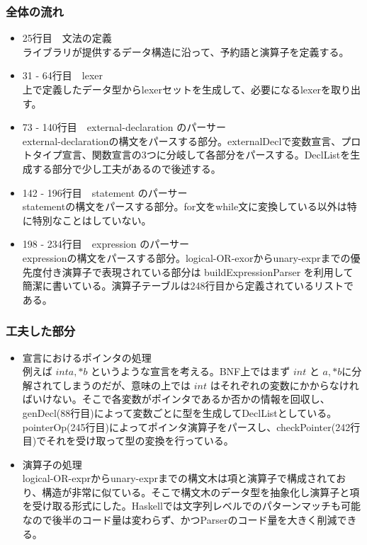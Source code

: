 \documentclass{jsarticle}
\begin{document}
\subsubsection{全体の流れ}
\begin{itemize}
\item 25行目　文法の定義 \mbox{} \\
ライブラリが提供するデータ構造に沿って、予約語と演算子を定義する。
\item 31 - 64行目　lexer \mbox{} \\
上で定義したデータ型からlexerセットを生成して、必要になるlexerを取り出す。
\item 73 - 140行目　external-declaration のパーサー \mbox{} \\
external-declarationの構文をパースする部分。externalDeclで変数宣言、プロトタイプ宣言、関数宣言の3つに分岐して各部分をパースする。DeclListを生成する部分で少し工夫があるので後述する。
\item 142 - 196行目　statement のパーサー \mbox{} \\
statementの構文をパースする部分。for文をwhile文に変換している以外は特に特別なことはしていない。
\item 198 - 234行目　expression のパーサー \mbox{} \\
expressionの構文をパースする部分。logical-OR-exorからunary-exprまでの優先度付き演算子で表現されている部分は buildExpressionParser を利用して簡潔に書いている。演算子テーブルは248行目から定義されているリストである。
\end{itemize}
\subsubsection{工夫した部分}
\begin{itemize}
\item 宣言におけるポインタの処理 \mbox{} \\
例えば $int a, *b$ というような宣言を考える。BNF上ではまず $int$ と $a, *b$に分解されてしまうのだが、意味の上では $int$ はそれぞれの変数にかからなければいけない。そこで各変数がポインタであるか否かの情報を回収し、genDecl(88行目)によって変数ごとに型を生成してDeclListとしている。pointerOp(245行目)によってポインタ演算子をパースし、checkPointer(242行目)でそれを受け取って型の変換を行っている。\\
\item 演算子の処理 \mbox{} \\
logical-OR-exprからunary-exprまでの構文木は項と演算子で構成されており、構造が非常に似ている。そこで構文木のデータ型を抽象化し演算子と項を受け取る形式にした。Haskellでは文字列レベルでのパターンマッチも可能なので後半のコード量は変わらず、かつParserのコード量を大きく削減できる。
\end{itemize}
\end{document}
